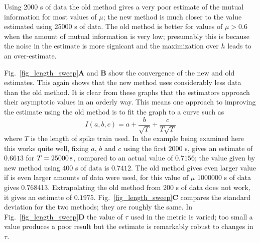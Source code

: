 \documentclass[12pt]{article}
\newcommand{\s}{\mbox{\,s}}
\begin{document}
Using 2000 s of data the old method gives a very poor estimate of the
mutual information for most values of $\mu$; the new method is much
closer to the value estimated using 25000 s of data. The old method
is better for values of $\mu>0.6$ when the amount of mutual
information is very low; presumably this is because the noise in the
estimate is more signicant and the maximization over $h$ leads to an
over-estimate.

Fig.~\ref{fig_length_sweep}\textbf{A} and \textbf{B} show the
convergence of the new and old estimates. This again shows that the
new method uses considerably less data than the old method. It is
clear from these graphs that the estimators approach their asymptotic
values in an orderly way. This means one approach to improving the
estimate using the old method is to fit the graph to a curve such as
\begin{equation}
I(a,b,c)=a+\frac{b}{\sqrt{T}}+\frac{c}{T\sqrt{T}}
\end{equation}
where $T$ is the length of spike train used. In the example being
examined here this works quite well, fixing $a$, $b$ and $c$ using the
first $2000$ s, gives an estimate of $0.6613$ for $T=25000\s$,
compared to an actual value of $0.7156$; the value given by new method
using 400 s of data is $0.7412$. The old method gives even larger
value if is even larger amounts of data were used, for this value of
$\mu$ 1000000 s of data gives 0.768413. Extrapolating the old method
from 200 s of data does not work, it gives an estimate of
$0.1975$. Fig.~\ref{fig_length_sweep}\textbf{C} compares the standard
deviation for the two methods; they are roughly the same. In
Fig.~\ref{fig_length_sweep}\textbf{D} the value of $\tau$ used in the
metric is varied; too small a value produces a poor result but the
estimate is remarkably robust to changes in $\tau$.
\end{document}
